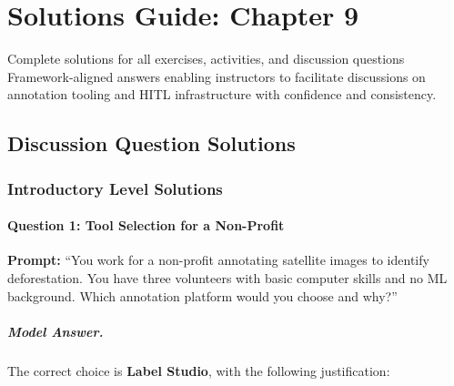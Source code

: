
\chapter{Solutions Guide: Chapter 9}
\label{ch:solutions-ch09}

\begin{chapterquote}{Complete solutions for all exercises, activities, and discussion questions}
Framework-aligned answers enabling instructors to facilitate discussions on annotation tooling and HITL infrastructure with confidence and consistency.
\end{chapterquote}

\section{Discussion Question Solutions}

\subsection{Introductory Level Solutions}

\subsubsection{Question 1: Tool Selection for a Non-Profit}

\textbf{Prompt:} ``You work for a non-profit annotating satellite images to identify deforestation. You have three volunteers with basic computer skills and no ML background. Which annotation platform would you choose and why?''

\paragraph{Model Answer.}

The correct choice is \textbf{Label Studio}, with the following justification:

